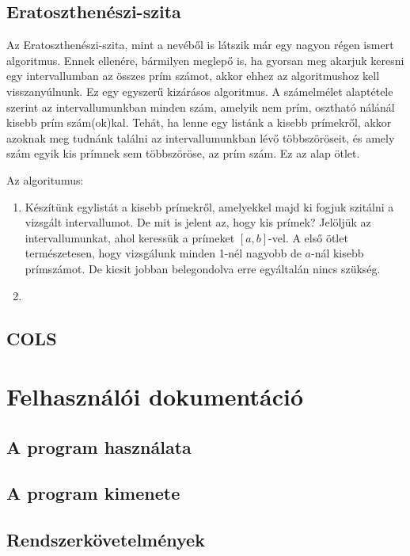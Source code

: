 \documentclass[twoside, a4paper, 12pt]{article}
\begin{document}
\subsection{Eratoszthenészi-szita}

Az Eratoszthenészi-szita, mint a nevéből is látszik már egy nagyon régen ismert algoritmus. Ennek ellenére, bármilyen meglepő is, ha gyorsan meg akarjuk keresni egy intervallumban az összes prím számot, akkor ehhez az algoritmushoz kell visszanyúlnunk. Ez egy egyszerű kizárásos algoritmus. A számelmélet alaptétele szerint az intervallumunkban minden szám, amelyik nem prím, osztható nálánál kisebb prím szám(ok)kal. Tehát, ha lenne egy listánk a kisebb prímekről, akkor azoknak meg tudnánk találni az intervallumunkban lévő többszöröseit, és amely szám egyik kis prímnek sem többszöröse, az prím szám. Ez az alap ötlet. \par
Az algoritumus: \par
\begin{enumerate}
\item Készítünk egylistát a kisebb prímekről, amelyekkel majd ki fogjuk szitálni a vizsgált intervallumot. De mit is jelent az, hogy kis prímek? Jelöljük az intervallumunkat, ahol keressük a prímeket \( [a, b] \)-vel. A első ötlet természetesen, hogy vizsgálunk minden 1-nél nagyobb de \(a\)-nál kisebb prímszámot. De kicsit jobban belegondolva erre egyáltalán nincs szükség. 
\item 
\end{enumerate}


\subsection{COLS}

\clearpage
\section{Felhasználói dokumentáció}

\subsection{A program használata} \label{usage}

\subsection{A program kimenete}

\subsection{Rendszerkövetelmények}
\end{document}
